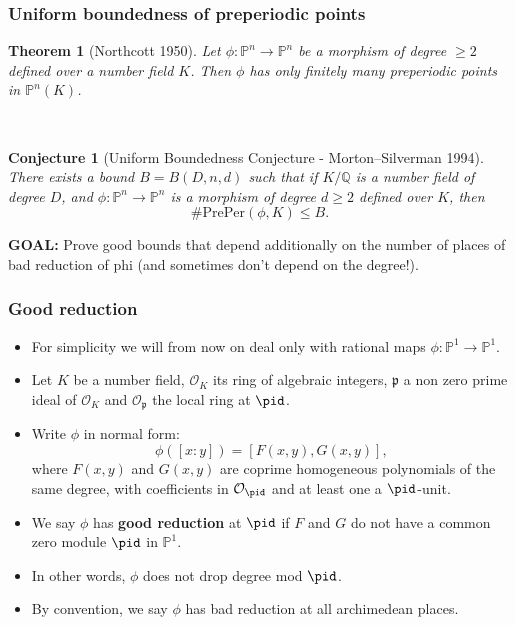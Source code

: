 \documentclass{beamer}
\def\PP{{\mathbb P}}
\theoremstyle{thmstyle}
\newtheorem*{mythm}{Theorem}
\theoremstyle{mystyle}
\newtheorem*{conjecture}{Conjecture}
\theoremstyle{qstnstyle}
\begin{document}
\begin{frame}
\frametitle{Uniform boundedness of preperiodic points}
\begin{mythm}[Northcott 1950]
Let $\phi : \PP^n \to \PP^n$ be a morphism of degree $\geq{2}$
defined over a number field $K$. Then $\phi$ has
only finitely many preperiodic points in $\PP^n(K)$.
\end{mythm}

\quad\\

\pause

\begin{conjecture}[Uniform Boundedness Conjecture - Morton--Silverman
  1994]
There exists a bound $B = B(D,n,d)$ such that if $K/\mathbb{Q}$ is a number field of degree $D$, and $\phi:\mathbb{P}^n\rightarrow\mathbb{P}^n$ is a morphism of degree $d\geq{2}$ defined over $K$, then 
$$\#\text{PrePer}(\phi,K) \leq B.$$
\end{conjecture}

\end{frame}


\begin{frame}

\textbf{GOAL:} Prove good bounds that depend additionally on the number of places of bad reduction of phi \pause (and sometimes don't depend on the degree!).


\end{frame}

\begin{frame}
\frametitle{Good reduction}

\begin{itemize}
\item For simplicity we will from now on deal only with rational maps $\phi:\mathbb{P}^1\to\mathbb{P}^1$. \pause
\item Let $K$ be a number field, $\mathcal{O}_K$ its ring of algebraic integers, $\mathfrak{p}$ a non zero prime ideal of $\mathcal{O}_K$
and $\mathcal{O}_{\mathfrak{p}}$ the local ring at $\pid$. \pause
\item Write $\phi$ in normal form: 
$$\phi([x : y]) = [F(x, y), G(x, y)],$$
where $F(x, y)$ and $G(x, y)$ are coprime
homogeneous polynomials of the same degree, with coefficients in $\mathcal{O}_\pid$ and at least one a $\pid$-unit. \pause
\item We say $\phi$ has \textbf{good reduction} at $\pid$ if $F$ and $G$ do not have a common zero module $\pid$ in $\mathbb{P}^1$.   \pause
\item In other words, $\phi$ does not drop degree mod $\pid$.  \pause
\item By convention, we say $\phi$ has bad reduction at all archimedean places.
\end{itemize}
\end{frame}
\end{document}
